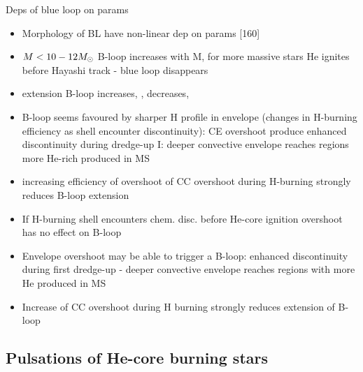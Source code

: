 \begin{frame}{Deps of blue loop on params}
	\begin{itemize}
	\item Morphology of BL have non-linear dep on params [160]
	\item $M<10-12M_{\odot}$ B-loop increases with M, for more massive stars He ignites before Hayashi track - blue loop disappears
	\item extension B-loop increases, , decreases, 
	\item B-loop seems favoured by sharper H profile in envelope (changes in H-burning efficiency as shell encounter discontinuity): CE overshoot produce enhanced discontinuity during dredge-up I: deeper convective envelope reaches regions more He-rich produced in MS
	\item increasing efficiency of overshoot of CC overshoot during H-burning strongly reduces B-loop extension
	\item If H-burning shell encounters chem. disc. before He-core ignition overshoot has no effect on B-loop
	\item Envelope overshoot may be able to trigger a B-loop: enhanced discontinuity during first dredge-up - deeper convective envelope reaches regions with more He produced in MS
	\item Increase of CC overshoot during H burning strongly reduces extension of B-loop
\end{itemize}
\end{frame}

\subsection{Pulsations of He-core burning stars}

